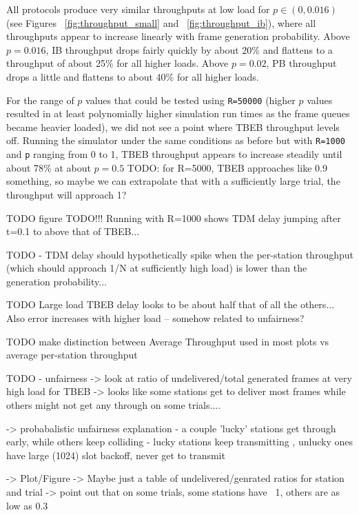 \documentclass[twocolumn]{article}
\begin{document}
All protocols produce very similar throughputs at low load for $p \in (0, 0.016)$
(see Figures ~\ref{fig:throughput_small} and ~\ref{fig:throughput_ib}), where
all throughputs appear to increase linearly with frame generation probability. 
Above $p=0.016$, IB throughput drops fairly quickly by about 20\% and flattens to a throughput
of about 25\% for all higher loads. Above $p=0.02$, PB throughput drops a little and flattens
to about 40\% for all higher loads. 


For the range of $p$ values that could be tested using \verb|R=50000| (higher
$p$ values resulted in at least polynomially higher simulation run times as the frame queues
became heavier loaded), we did not see a point where TBEB throughput levels off. Running
the simulator under the same conditions as before but with \verb|R=1000| and \verb|p| ranging
from 0 to 1, TBEB throughput appears to increase steadily until about 78\% at about $p = 0.5$
TODO: for R=5000, TBEB approaches like 0.9 something, so maybe we can extrapolate that with
a sufficiently large trial, the throughput will approach 1?

TODO figure
TODO!!! Running with R=1000 shows TDM delay jumping after t=0.1 to above that of TBEB...

TODO - TDM delay should hypothetically spike when the per-station throughput 
(which should approach 1/N at sufficiently high load) is lower than the generation probability...

TODO Large load TBEB delay looks to be about half that of all the others... Also error increases
with higher load -- somehow related to unfairness?

TODO make distinction between Average Throughput used in most plots vs average per-station 
throughput

TODO - unfairness -> look at ratio of undelivered/total generated frames at very high load
                     for TBEB -> looks like some stations get to deliver most frames while others
                     might not get any through on some trials....

                     -> probabalistic unfairness explanation - a couple 'lucky' stations get 
                     through early, while others keep colliding - lucky stations keep transmitting
                     , unlucky ones have large (1024) slot backoff, never get to transmit

     -> Plot/Figure -> Maybe just a table of undelivered/genrated ratios for station and trial
                        -> point out that on some trials, some stations have ~1, others are as 
                        low as 0.3
\end{document}
